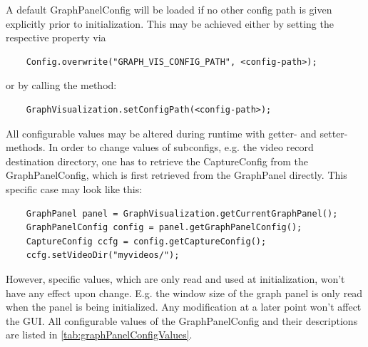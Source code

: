 A default GraphPanelConfig will be loaded if no other config path is given explicitly prior to initialization. This may be achieved either by setting the respective property via 
\begin{lstlisting}
	Config.overwrite("GRAPH_VIS_CONFIG_PATH", <config-path>);
\end{lstlisting}
or by calling the method:
\begin{lstlisting}
	GraphVisualization.setConfigPath(<config-path>);
\end{lstlisting}
All configurable values may be altered during runtime with getter- and setter-methods. In order to change values of subconfigs, e.g. the video record destination directory, one has to retrieve the CaptureConfig from the GraphPanelConfig, which is first retrieved from the GraphPanel directly. This specific case may look like this:
\begin{lstlisting}
	GraphPanel panel = GraphVisualization.getCurrentGraphPanel();
	GraphPanelConfig config = panel.getGraphPanelConfig();
	CaptureConfig ccfg = config.getCaptureConfig();
	ccfg.setVideoDir("myvideos/");
\end{lstlisting}
However, specific values, which are only read and used at initialization, won't have any effect upon change. E.g. the window size of the graph panel is only read when the panel is being initialized. Any modification at a later point won't affect the GUI. 
All configurable values of the GraphPanelConfig and their descriptions are listed in \ref{tab:graphPanelConfigValues}.

